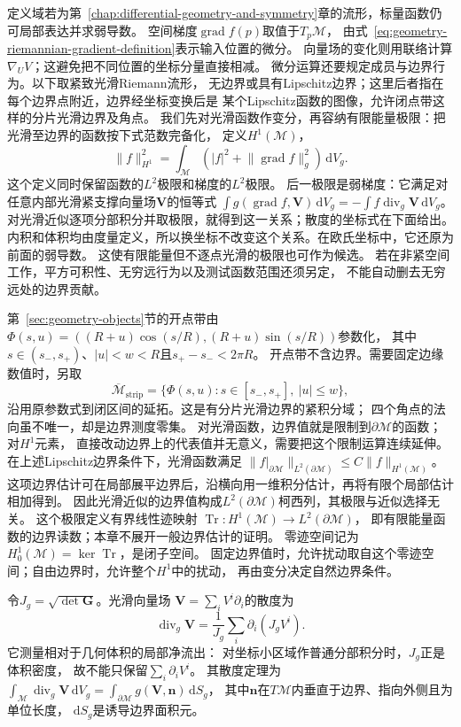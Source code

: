 定义域若为第~\ref{chap:differential-geometry-and-symmetry}章的流形，标量函数仍可局部表达并求弱导数。
空间梯度$\operatorname{grad}f(p)$取值于$T_p\mathcal M$，
由式~\eqref{eq:geometry-riemannian-gradient-definition}表示输入位置的微分。
向量场的变化则用联络计算$\nabla_U V$；这避免把不同位置的坐标分量直接相减。
微分运算还要规定成员与边界行为。以下取紧致光滑Riemann流形，
无边界或具有Lipschitz边界；这里后者指在每个边界点附近，边界经坐标变换后是
某个Lipschitz函数的图像，允许闭点带这样的分片光滑边界及角点。
我们先对光滑函数作变分，再容纳有限能量极限：把光滑至边界的函数按下式范数完备化，
定义$H^1(\mathcal M)$，
\[
 \lVert f\rVert_{H^1}^2
 =\int_{\mathcal M}(|f|^2+\lVert\operatorname{grad}f\rVert_g^2)\,\mathrm dV_g.
\]
这个定义同时保留函数的$L^2$极限和梯度的$L^2$极限。
后一极限是弱梯度：它满足对任意内部光滑紧支撑向量场$\bm V$的恒等式
$\int g(\operatorname{grad}f,\bm V)\,\mathrm dV_g
=-\int f\operatorname{div}_g\bm V\,\mathrm dV_g$。
对光滑近似逐项分部积分并取极限，就得到这一关系；散度的坐标式在下面给出。
内积和体积均由度量定义，所以换坐标不改变这个关系。在欧氏坐标中，它还原为前面的弱导数。
这使有限能量但不逐点光滑的极限也可作为候选。
若在非紧空间工作，平方可积性、无穷远行为以及测试函数范围还须另定，
不能自动删去无穷远处的边界贡献。

第~\ref{sec:geometry-objects}节的开点带由
$\Phi(s,u)=((R+u)\cos(s/R),(R+u)\sin(s/R))$参数化，
其中$s\in(s_-,s_+)$、$|u|<w<R$且$s_+-s_-<2\pi R$。
开点带不含边界。需要固定边缘数值时，另取
\[
 \overline{\mathcal M}_{\mathrm{strip}}
 =\{\Phi(s,u):s\in[s_-,s_+],\ |u|\leq w\},
\]
沿用原参数式到闭区间的延拓。这是有分片光滑边界的紧积分域；
四个角点的法向虽不唯一，却是边界测度零集。
对光滑函数，边界值就是限制到$\partial\mathcal M$的函数；对$H^1$元素，
直接改动边界上的代表值并无意义，需要把这个限制运算连续延伸。
在上述Lipschitz边界条件下，光滑函数满足
$\lVert f|_{\partial\mathcal M}\rVert_{L^2(\partial\mathcal M)}
\leq C\lVert f\rVert_{H^1(\mathcal M)}$。
这项边界估计可在局部展平边界后，沿横向用一维积分估计，再将有限个局部估计相加得到。
因此光滑近似的边界值构成$L^2(\partial\mathcal M)$柯西列，其极限与近似选择无关。
这个极限定义有界线性迹映射
$\operatorname{Tr}:H^1(\mathcal M)\to L^2(\partial\mathcal M)$，
即有限能量函数的边界读数；本章不展开一般边界估计的证明。
零迹空间记为$H_0^1(\mathcal M)=\ker\operatorname{Tr}$，是闭子空间。
固定边界值时，允许扰动取自这个零迹空间；自由边界时，允许整个$H^1$中的扰动，
再由变分决定自然边界条件。

令$J_g=\sqrt{\det\bm G}$。光滑向量场
$\bm V=\sum_iV^i\partial_i$的散度为
\[
 \operatorname{div}_g\bm V
 =\frac1{J_g}\sum_i\partial_i(J_gV^i).
\]
它测量相对于几何体积的局部净流出：
对坐标小区域作普通分部积分时，$J_g$正是体积密度，
故不能只保留$\sum_i\partial_iV^i$。
其散度定理为
$\int_{\mathcal M}\operatorname{div}_g\bm V\,\mathrm dV_g
=\int_{\partial\mathcal M}g(\bm V,\bm n)\,\mathrm dS_g$，
其中$\bm n$在$T\mathcal M$内垂直于边界、指向外侧且为单位长度，
$\mathrm dS_g$是诱导边界面积元。

